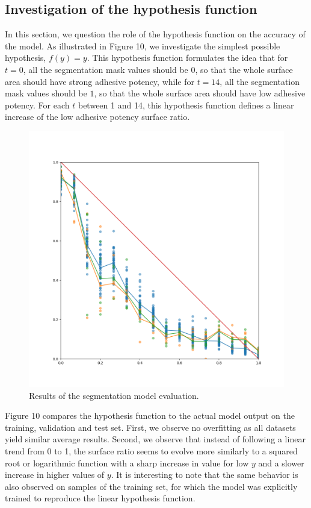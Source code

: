\documentclass[10pt,twocolumn,letterpaper]{article}
\begin{document}
\subsection{Investigation of the hypothesis function}
In this section, we question the role of the hypothesis function on the accuracy of the model.
As illustrated in Figure 10, we investigate the simplest possible hypothesis, $f(y)=y$.
This hypothesis function formulates the idea that for $t=0$, 
all the  segmentation mask values should be 0, 
so that the whole surface area should have strong adhesive potency, 
while for $t=14$, all the segmentation mask values should be $1$, so that 
the whole surface area should have low adhesive potency.
For each $t$ between 1 and 14, this hypothesis function defines a linear increase
of the low adhesive potency surface ratio.

\begin{figure}[h]
	\centering
	\includegraphics[width=0.9\linewidth]{"./figures/Figure10"}
	\caption{
		Results of the segmentation model evaluation.
	}
\end{figure}

Figure 10 compares the hypothesis function to the actual model output on the training, 
validation and test set.
First, we observe no overfitting as all datasets yield similar average results.
Second, we observe that instead of following a linear trend from 0 to 1, 
the surface ratio seems to evolve more similarly to a squared root or logarithmic function
with a sharp increase in value for low $y$ and a slower increase in higher values of $y$.
It is interesting to note that the same behavior is also observed on samples of the training set, 
for which the model was explicitly trained to reproduce the linear hypothesis function.
\end{document}
